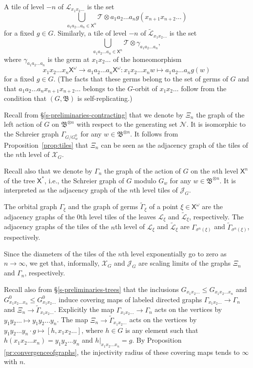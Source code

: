 \documentclass[11pt]{amsart}
\newcommand{\bim}{\mathfrak{B}}
\newcommand{\arr}{\longrightarrow}
\newcommand{\lims}[1][G]{\mathcal{J}_{#1}}
\newcommand{\limg}[1][G]{\mathcal{X}_{#1}}
\newcommand{\til}{\mathcal{T}}
\newcommand{\xs}{\alb^\ast}
\newcommand{\xo}{\alb^\omega}
\newcommand{\leaf}{\mathcal{L}}
\newcommand{\leaftilde}{\widetilde{\leaf}}
\newcommand{\alb}{\ensuremath{\mathsf{X}}}%
\newcommand{\nuke}{\ensuremath{\mathcal{N}}}%
\newcommand{\Gammatilde}{\ensuremath{\widetilde{\Gamma}}}%
\theoremstyle{definition}
\theoremstyle{plain}
\newtheorem{main thm}{Theorem}
\theoremstyle{remark}
\theoremstyle{plain}
\begin{document}
A tile of level $-n$ of $\leaf_{x_1x_2\ldots}$ is the set \[\bigcup_{a_1a_2\ldots a_n\in\alb^n}\til\otimes a_1a_2\ldots a_ng(x_{n+1}x_{n+2}\ldots)\] for a fixed $g\in G$. Similarly, a tile of level $-n$ of $\leaftilde_{x_1x_2\ldots}$ is the set \[\bigcup_{a_1a_2\ldots a_n\in\alb^n}\til\otimes \gamma_{a_1a_2\ldots a_n},\] where $\gamma_{a_1a_2\ldots a_n}$ is the germ at $x_1x_2\ldots$ of the homeomorphism \[x_1x_2\ldots x_n\xo\arr a_1a_2\ldots a_n\xo\colon x_1x_2\ldots x_nw\mapsto a_1a_2\ldots a_ng(w)\] for a fixed $g\in G$. (The facts that these germs belong to the set of germs of $G$ and that $a_1a_2\ldots a_nx_{n+1}x_{n+2}\ldots$ belongs to the $G$-orbit of $x_1x_2\ldots$ follow from the condition that $(G, \bim)$ is self-replicating.)


Recall from \S\ref{s-preliminaries-contracting} that we denote by $\Xi_n$ the graph of the left action of $G$ on $\bim^{\otimes n}$ with respect to the generating set $\nuke$. It is isomorphic to the Schreier graph $\Gamma_{G/G_w^0}$ for any $w\in\bim^{\otimes n}$. It follows from Proposition~\ref{prop:tiles} that $\Xi_n$ can be seen as the adjacency graph of the tiles of the $n$th level of $\limg$.

Recall also that we denote by $\Gamma_n$ the graph of the action of $G$ on the $n$th level $\alb^n$ of the tree $\xs$, i.e., the Schreier graph of $G$ modulo $G_w$ for any $w\in\bim^{\otimes n}$. It is interpreted as the adjacency graph of the $n$th level tiles of $\lims$.

The orbital graph $\Gamma_\xi$ and the graph of germs $\Gammatilde_\xi$ of a point $\xi\in\xo$ are the adjacency graphs of the $0$th level tiles of the leaves $\leaf_\xi$ and $\leaftilde_\xi$, respectively. The adjacency graphs of the tiles of the $n$th level of $\leaf_\xi$ and $\leaftilde_\xi$ are $\Gamma_{\sigma^n(\xi)}$ and $\Gammatilde_{\sigma^n(\xi)}$, respectively.

Since the diameters of the tiles of the $n$th level exponentially go to zero as $n\to\infty$, we get that, informally, $\limg$ and $\lims$ are scaling limits of the graphs $\Xi_n$ and $\Gamma_n$, respectively. 

Recall also from \S\ref{s-preliminaries-trees} that the inclusions $G_{x_1x_2\ldots}\le G_{x_1x_2\ldots x_n}$ and $G_{x_1x_2\ldots x_n}^0\le G_{x_1x_2\ldots}^0$ induce covering maps of labeled directed graphs $\Gamma_{x_1x_2\ldots}\arr\Gamma_n$ and $\Xi_n\arr\Gammatilde_{x_1x_2\ldots}$. Explicitly the map $\Gamma_{x_1x_2\ldots}\arr\Gamma_n$ acts on the vertices by $y_1y_2\ldots\mapsto y_1y_2\ldots y_n$. The map $\Xi_n\arr\Gammatilde_{x_1x_2\ldots}$ acts on the vertices by $y_1y_2\ldots y_n\cdot g\mapsto [h, x_1x_2\ldots]$, where $h\in G$ is any element such that $h(x_1x_2\ldots x_n)=y_1y_2\ldots y_n$ and $h|_{x_1x_2\ldots x_n}=g$. By Proposition \ref{pr:convergenceofgraphs}, the injectivity radius of these covering maps tends to $\infty$ with $n$.
\end{document}
